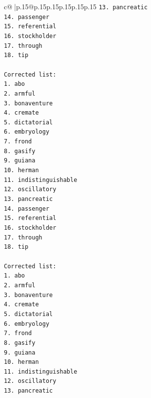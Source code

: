 \documentclass{article}
\begin{document}
{\begin{supertabular}{c@{$\;$}|p{.15\linewidth}@{}p{.15\linewidth}p{.15\linewidth}p{.15\linewidth}p{.15\linewidth}p{.15\linewidth}}
{{{\texttt{13. pancreatic} \\
\texttt{14. passenger} \\
\texttt{15. referential} \\
\texttt{16. stockholder} \\
\texttt{17. through} \\
\texttt{18. tip } \\
\\ 
\texttt{Corrected list: } \\
\texttt{1. abo} \\
\texttt{2. armful} \\
\texttt{3. bonaventure} \\
\texttt{4. cremate} \\
\texttt{5. dictatorial} \\
\texttt{6. embryology} \\
\texttt{7. frond} \\
\texttt{8. gasify} \\
\texttt{9. guiana} \\
\texttt{10. herman} \\
\texttt{11. indistinguishable} \\
\texttt{12. oscillatory} \\
\texttt{13. pancreatic} \\
\texttt{14. passenger} \\
\texttt{15. referential} \\
\texttt{16. stockholder} \\
\texttt{17. through} \\
\texttt{18. tip } \\
\\ 
\texttt{Corrected list: } \\
\texttt{1. abo} \\
\texttt{2. armful} \\
\texttt{3. bonaventure} \\
\texttt{4. cremate} \\
\texttt{5. dictatorial} \\
\texttt{6. embryology} \\
\texttt{7. frond} \\
\texttt{8. gasify} \\
\texttt{9. guiana} \\
\texttt{10. herman} \\
\texttt{11. indistinguishable} \\
\texttt{12. oscillatory} \\
\texttt{13. pancreatic} \\
}}}
\end{supertabular}}
\end{document}
